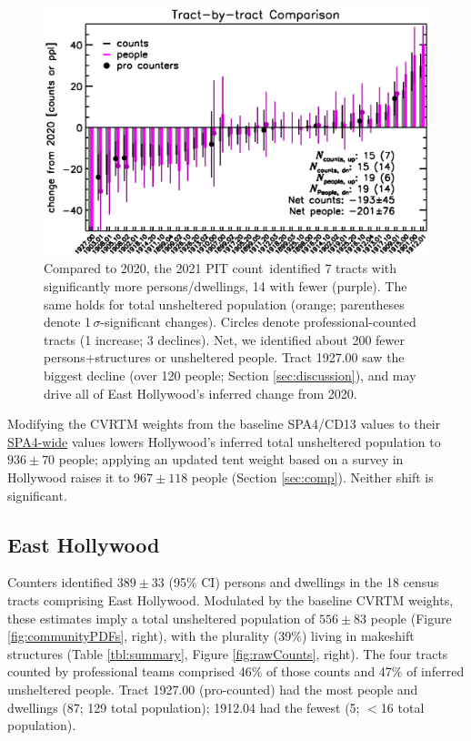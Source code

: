 \documentclass[11pt,twocolumn]{article}
\def\Count{count}
\def\nce{389}
\def\ne{556\pm83}
\begin{document}
\begin{figure}[]
	\centering
	\includegraphics[width = 0.9\linewidth, trim = 0cm 0cm 0cm 0cm]{tractsYrYr}
	\caption{Compared to 2020, the 2021 PIT \Count\ identified 7 tracts with significantly more
			persons/dwellings, 14 with fewer (purple). The same holds for total unsheltered 
			population (orange; parentheses denote 1\,$\sigma$-significant changes). 
			Circles denote professional-counted tracts (1 increase; 3 declines). Net, 
			we identified about 200 fewer persons+structures or unsheltered 
			people. Tract 1927.00 saw the biggest decline (over 120 people; Section \ref{sec:discussion}), and
			may drive all of East Hollywood's inferred change from 2020.}
	\label{fig:tractYrYr}
\end{figure}

Modifying the CVRTM weights from the baseline SPA4/CD13 values to their 
\href{https://www.lahsa.org/documents?id=4693-2020-greater-los-angeles-homeless-count-cvrtm-conversion-factors}
{SPA4-wide} values lowers Hollywood's inferred total unsheltered population to $936\pm70$ people; applying
an updated tent weight based on a survey in Hollywood raises it to $967\pm118$ people (Section
\ref{sec:comp}). Neither shift is significant.

\subsection{East Hollywood}
\label{sec:eHo}

Counters identified $\nce\pm33$ (95\% CI) persons and dwellings in the 18 census tracts 
comprising East Hollywood. Modulated by the baseline CVRTM weights, these estimates imply 
a total unsheltered population of $\ne$ people (Figure \ref{fig:communityPDFs},
right), with the plurality (39\%) living in makeshift structures (Table \ref{tbl:summary}, 
Figure \ref{fig:rawCounts}, right). The four tracts counted by professional teams comprised 46\% of 
those counts and 47\% of inferred unsheltered people. Tract 1927.00 (pro-counted) had the 
most people and dwellings (87; 129 total population); 1912.04 had the fewest 
(5; $<$16 total population). 
\end{document}
